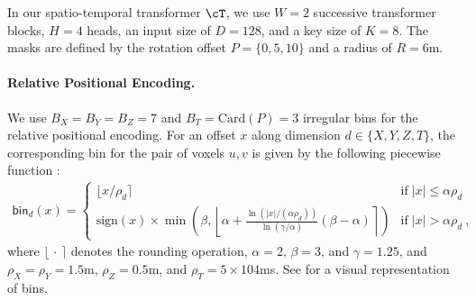 \documentclass[runningheads]{tpls/llncs}
\begin{document}
In our spatio-temporal transformer $\cT$, we use $W=2$ successive transformer blocks, $H=4$ heads, an input size of $D=128$, and a key size of $K=8$. The masks are defined by the rotation offset $P=\{0,5,10\}$ and a radius of $R=6$m.

\paragraph{Relative Positional Encoding.}
We use $B_X=B_Y=B_Z=7$ and $B_T=\text{Card}(P)=3$ irregular bins for the relative positional encoding.
For an offset $x$ along dimension $d\in\{X,Y,Z,T\}$, the corresponding bin for the pair of voxels $u, v$ is given by the following piecewise function \cite[Eq~18]{wu2021rethinking}:
\begin{align}
\mathsf{bin}_d(x)=
\begin{cases}
\lfloor x / \rho_d\rceil 
&\text{if}\; |x|\leq\alpha\rho_d \\
 \text{sign}(x)\times \min\left(\beta,\left\lfloor\alpha+\frac{\ln(|x|/(\alpha\rho_d))}{\ln(\gamma/\alpha)}(\beta-\alpha) \right\rceil\right)
 & \text{if}\; |x|>\alpha\rho_d~,
 \end{cases}
\end{align}
\noindent where $\lfloor\,\cdot\,\rceil$ denotes the rounding operation, $\alpha=2$, $\beta=3$, and $\gamma=1.25$, and $\rho_X=\rho_Y=1.5$m, $\rho_Z=0.5$m, and $\rho_T=5\times104$ms.  See  for a visual representation of bins.
\end{document}
